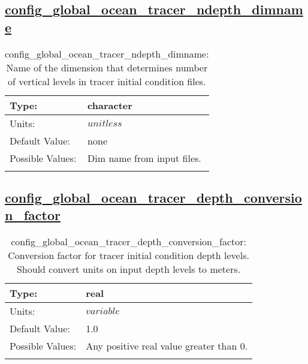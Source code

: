 \subsection[config\_global\_ocean\_tracer\_ndepth\_dimname]{\hyperref[sec:nm_tab_global_ocean]{config\_global\_ocean\_tracer\_ndepth\_dimname}}
\label{subsec:nm_sec_config_global_ocean_tracer_ndepth_dimname}
\begin{center}
\begin{longtable}{| p{2.0in} || p{4.0in} |}
    \hline
    Type: & character \\
    \hline
    Units: & $unitless$ \\
    \hline
    Default Value: & none \\
    \hline
    Possible Values: & Dim name from input files. \\
    \hline
    \caption{config\_global\_ocean\_tracer\_ndepth\_dimname: Name of the dimension that determines number of vertical levels in tracer initial condition files.}
\end{longtable}
\end{center}
\subsection[config\_global\_ocean\_tracer\_depth\_conversion\_factor]{\hyperref[sec:nm_tab_global_ocean]{config\_global\_ocean\_tracer\_depth\_conversion\_factor}}
\label{subsec:nm_sec_config_global_ocean_tracer_depth_conversion_factor}
\begin{center}
\begin{longtable}{| p{2.0in} || p{4.0in} |}
    \hline
    Type: & real \\
    \hline
    Units: & $variable$ \\
    \hline
    Default Value: & 1.0 \\
    \hline
    Possible Values: & Any positive real value greater than 0. \\
    \hline
    \caption{config\_global\_ocean\_tracer\_depth\_conversion\_factor: Conversion factor for tracer initial condition depth levels. Should convert units on input depth levels to meters.}
\end{longtable}
\end{center}

